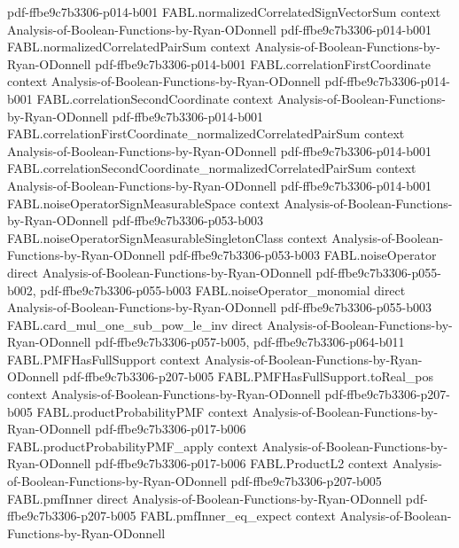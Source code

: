 \begin{theorem}
  {pdf-ffbe9c7b3306-p014-b001}
\proofstep
  {FABL.normalizedCorrelatedSignVectorSum}
  {context}
  {Analysis-of-Boolean-Functions-by-Ryan-ODonnell}
  {pdf-ffbe9c7b3306-p014-b001}
\proofstep
  {FABL.normalizedCorrelatedPairSum}
  {context}
  {Analysis-of-Boolean-Functions-by-Ryan-ODonnell}
  {pdf-ffbe9c7b3306-p014-b001}
\proofstep
  {FABL.correlationFirstCoordinate}
  {context}
  {Analysis-of-Boolean-Functions-by-Ryan-ODonnell}
  {pdf-ffbe9c7b3306-p014-b001}
\proofstep
  {FABL.correlationSecondCoordinate}
  {context}
  {Analysis-of-Boolean-Functions-by-Ryan-ODonnell}
  {pdf-ffbe9c7b3306-p014-b001}
\proofstep
  {FABL.correlationFirstCoordinate_normalizedCorrelatedPairSum}
  {context}
  {Analysis-of-Boolean-Functions-by-Ryan-ODonnell}
  {pdf-ffbe9c7b3306-p014-b001}
\proofstep
  {FABL.correlationSecondCoordinate_normalizedCorrelatedPairSum}
  {context}
  {Analysis-of-Boolean-Functions-by-Ryan-ODonnell}
  {pdf-ffbe9c7b3306-p014-b001}
\proofstep
  {FABL.noiseOperatorSignMeasurableSpace}
  {context}
  {Analysis-of-Boolean-Functions-by-Ryan-ODonnell}
  {pdf-ffbe9c7b3306-p053-b003}
\proofstep
  {FABL.noiseOperatorSignMeasurableSingletonClass}
  {context}
  {Analysis-of-Boolean-Functions-by-Ryan-ODonnell}
  {pdf-ffbe9c7b3306-p053-b003}
\proofstep
  {FABL.noiseOperator}
  {direct}
  {Analysis-of-Boolean-Functions-by-Ryan-ODonnell}
  {pdf-ffbe9c7b3306-p055-b002,
    pdf-ffbe9c7b3306-p055-b003}
\proofstep
  {FABL.noiseOperator_monomial}
  {direct}
  {Analysis-of-Boolean-Functions-by-Ryan-ODonnell}
  {pdf-ffbe9c7b3306-p055-b003}
\proofstep
  {FABL.card_mul_one_sub_pow_le_inv}
  {direct}
  {Analysis-of-Boolean-Functions-by-Ryan-ODonnell}
  {pdf-ffbe9c7b3306-p057-b005,
    pdf-ffbe9c7b3306-p064-b011}
\proofstep
  {FABL.PMFHasFullSupport}
  {context}
  {Analysis-of-Boolean-Functions-by-Ryan-ODonnell}
  {pdf-ffbe9c7b3306-p207-b005}
\proofstep
  {FABL.PMFHasFullSupport.toReal_pos}
  {context}
  {Analysis-of-Boolean-Functions-by-Ryan-ODonnell}
  {pdf-ffbe9c7b3306-p207-b005}
\proofstep
  {FABL.productProbabilityPMF}
  {context}
  {Analysis-of-Boolean-Functions-by-Ryan-ODonnell}
  {pdf-ffbe9c7b3306-p017-b006}
\proofstep
  {FABL.productProbabilityPMF_apply}
  {context}
  {Analysis-of-Boolean-Functions-by-Ryan-ODonnell}
  {pdf-ffbe9c7b3306-p017-b006}
\proofstep
  {FABL.ProductL2}
  {context}
  {Analysis-of-Boolean-Functions-by-Ryan-ODonnell}
  {pdf-ffbe9c7b3306-p207-b005}
\proofstep
  {FABL.pmfInner}
  {direct}
  {Analysis-of-Boolean-Functions-by-Ryan-ODonnell}
  {pdf-ffbe9c7b3306-p207-b005}
\proofstep
  {FABL.pmfInner_eq_expect}
  {context}
  {Analysis-of-Boolean-Functions-by-Ryan-ODonnell}

\end{theorem}
